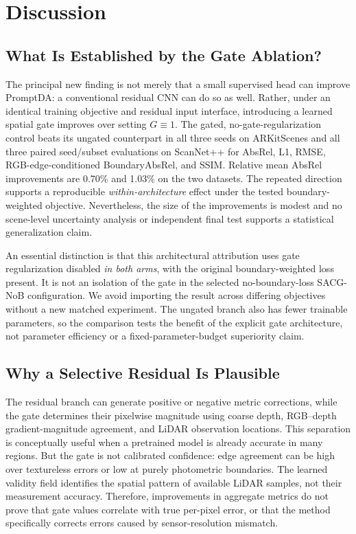 \section{Discussion}
\label{sec:discussion}
\subsection{What Is Established by the Gate Ablation?}
The principal new finding is not merely that a small supervised head can improve PromptDA: a conventional residual CNN can do so as well. Rather, under an identical training objective and residual input interface, introducing a learned spatial gate improves over setting $G\equiv1$. The gated, no-gate-regularization control beats its ungated counterpart in all three seeds on ARKitScenes and all three paired seed/subset evaluations on ScanNet++ for AbsRel, L1, RMSE, RGB-edge-conditioned BoundaryAbsRel, and SSIM. Relative mean AbsRel improvements are 0.70\% and 1.03\% on the two datasets. The repeated direction supports a reproducible \emph{within-architecture} effect under the tested boundary-weighted objective. Nevertheless, the size of the improvements is modest and no scene-level uncertainty analysis or independent final test supports a statistical generalization claim.

An essential distinction is that this architectural attribution uses gate regularization disabled \emph{in both arms}, with the original boundary-weighted loss present. It is not an isolation of the gate in the selected no-boundary-loss SACG-NoB configuration. We avoid importing the result across differing objectives without a new matched experiment. The ungated branch also has fewer trainable parameters, so the comparison tests the benefit of the explicit gate architecture, not parameter efficiency or a fixed-parameter-budget superiority claim.

\subsection{Why a Selective Residual Is Plausible}
The residual branch can generate positive or negative metric corrections, while the gate determines their pixelwise magnitude using coarse depth, RGB--depth gradient-magnitude agreement, and LiDAR observation locations. This separation is conceptually useful when a pretrained model is already accurate in many regions. But the gate is not calibrated confidence: edge agreement can be high over textureless errors or low at purely photometric boundaries. The learned validity field identifies the spatial pattern of available LiDAR samples, not their measurement accuracy. Therefore, improvements in aggregate metrics do not prove that gate values correlate with true per-pixel error, or that the method specifically corrects errors caused by sensor-resolution mismatch.

